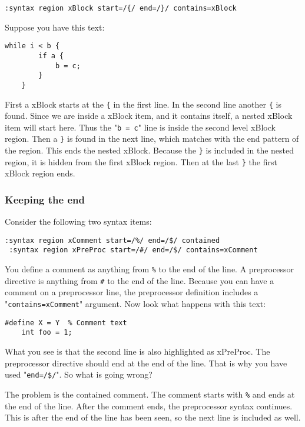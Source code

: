 \begin{Verbatim}[samepage=true]
 :syntax region xBlock start=/{/ end=/}/ contains=xBlock
\end{Verbatim}

Suppose you have this text:

\begin{Verbatim}[samepage=true]
    while i < b { 
        if a { 
            b = c; 
        } 
    } 
\end{Verbatim}

First a xBlock starts at the \verb!{! in the first line.
In the second line another \verb!{! is found.
Since we are inside a xBlock item, and it contains itself, a nested xBlock item will start here.
Thus the "\verb!b = c!" line is inside the second level xBlock region.
Then a \verb!}! is found in the next line, which matches with the end pattern of the region.
This ends the nested xBlock.
Because the \verb!}! is included in the nested region, it is hidden from the first xBlock region.
Then at the last \verb!}! the first xBlock region ends.

\subsubsection{Keeping the end}
Consider the following two syntax items:

\begin{Verbatim}[samepage=true]
 :syntax region xComment start=/%/ end=/$/ contained
 :syntax region xPreProc start=/#/ end=/$/ contains=xComment
\end{Verbatim}

You define a comment as anything from \verb!%! to the end of the line.
A preprocessor directive is anything from \verb!#! to the end of the line.
Because you can have a comment on a preprocessor line, the preprocessor definition includes a "\verb!contains=xComment!" argument.
Now look what happens with this text:

\begin{Verbatim}[samepage=true]
    #define X = Y  % Comment text 
    int foo = 1; 
\end{Verbatim}

What you see is that the second line is also highlighted as xPreProc.
The preprocessor directive should end at the end of the line.
That is why you have used "\verb!end=/$/!".
So what is going wrong?

The problem is the contained comment.
The comment starts with \verb!%! and ends at the end of the line.
After the comment ends, the preprocessor syntax continues.
This is after the end of the line has been seen, so the next line is included as well.

